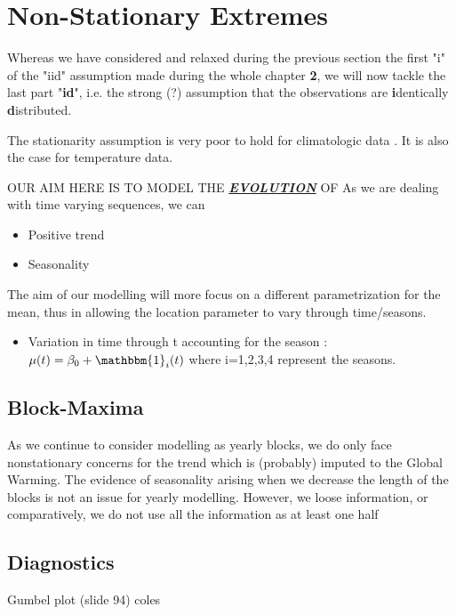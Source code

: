 \section{Non-Stationary Extremes}\label{nstatio}

Whereas we have considered and relaxed during the previous section the first "i" of the "iid" assumption made during the whole chapter \textbf{2}, we will now tackle the last part "\textbf{id}", i.e. the strong (?) assumption that the observations are \textbf{i}dentically \textbf{d}istributed.

The stationarity assumption is very poor to hold for climatologic data \cite{milly_climate_2008}. It is also the case for temperature data.

OUR AIM HERE IS TO MODEL THE \textbf{\textit{\underline{EVOLUTION}}} OF 
As we are dealing with time varying sequences, we can

\begin{itemize}
	\item Positive trend
	\item Seasonality
\end{itemize}

The aim of our modelling will more focus on a different parametrization for the mean, thus in allowing the location parameter to vary through time/seasons.

\begin{itemize}
	\item Variation in time through t accounting for the season : $\mu (t)=\beta_0+\mathbbm{1}_i(t)$ where i=1,2,3,4 represent the seasons.
\end{itemize}



\subsection{Block-Maxima}

As we continue to consider modelling as yearly blocks, we do only face nonstationary concerns for the trend which is (probably) imputed to the Global Warming. 
The evidence of seasonality arising when we decrease the length of the blocks is not an issue for yearly modelling. However, we loose information, or comparatively, we do not use all the information as at least one half 


\subsection{Diagnostics}
Gumbel plot (slide 94) coles


